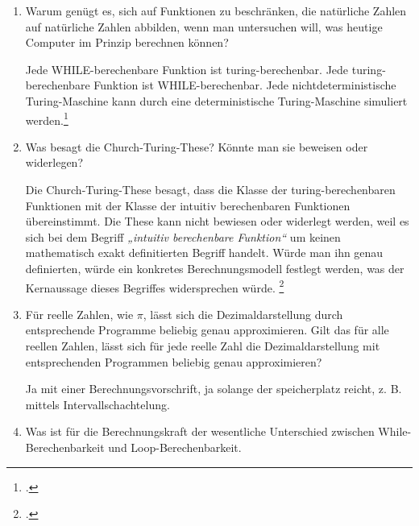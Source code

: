 \documentclass{bschlangaul-aufgabe}
\begin{document}
\begin{enumerate}



\item Warum genügt es, sich auf Funktionen zu beschränken, die
natürliche Zahlen auf natürliche Zahlen abbilden, wenn man untersuchen
will, was heutige Computer im Prinzip berechnen können?

\begin{bAntwort}
Jede WHILE-berechenbare Funktion ist turing-berechenbar. Jede
turing-berechenbare Funktion ist WHILE-berechenbar. Jede
nichtdeterministische Turing-Maschine kann durch eine deterministische
Turing-Maschine simuliert werden.\footcite[Seite 24-28]{theo:fs:4}
\end{bAntwort}


\item Was besagt die Church-Turing-These? Könnte man sie beweisen oder
widerlegen?

\begin{bAntwort}
Die Church-Turing-These besagt, dass die Klasse der turing-berechen\-baren
Funktionen mit der Klasse der intuitiv berechenbaren Funktionen
übereinstimmt. Die These kann nicht bewiesen oder widerlegt werden, weil
es sich bei dem Begriff \emph{„intuitiv berechenbare Funktion“} um
keinen mathematisch exakt definitierten Begriff handelt. Würde man ihn
genau definierten, würde ein konkretes Berechnungsmodell festlegt
werden, was der Kernaussage dieses Begriffes widersprechen würde.
\footcite[Seite 308, These 6.1]{hoffmann}
\end{bAntwort}



\item Für reelle Zahlen, wie \zB $\pi$, lässt sich die
Dezimaldarstellung durch entsprechende Programme beliebig genau
approximieren. Gilt das für alle reellen Zahlen, \dh lässt sich für
jede reelle Zahl die Dezimaldarstellung mit entsprechenden Programmen
beliebig genau approximieren?

\begin{bAntwort}
Ja mit einer Berechnungsvorschrift, ja solange der speicherplatz reicht,
z. B. mittels Intervallschachtelung.
\end{bAntwort}


\item Was ist für die Berechnungskraft der wesentliche Unterschied
zwischen While-Berechenbarkeit und Loop-Berechenbarkeit.


\end{enumerate}
\end{document}
